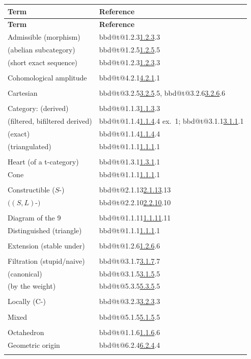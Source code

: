 \documentclass[12pt,oneside]{amsbook}
\makeatletter
\DeclareRobustCommand{\rn}[1]{%
  \ifcsname bbd@t@#1\endcsname\hyperlink{bbd:#1}{#1}\else#1\fi}
\theoremstyle{plain}
\theoremstyle{definition}
\makeatother
\begin{document}
\begin{longtable}{@{}p{}p{}@{}}
\hline
\textbf{Term} & \textbf{Reference}\\
\hline
\endfirsthead
\hline
\textbf{Term} & \textbf{Reference}\\
\hline
\endhead
Admissible (morphism) & \rn{1.2.3}\\
\quad (abelian subcategory) & \rn{1.2.5}\\
\quad (short exact sequence) & \rn{1.2.3}\\[3pt]\\
Cohomological amplitude & \rn{4.2.1}\\[3pt]\\
Cartesian & \rn{3.2.5}, \rn{3.2.6}\\[3pt]\\
Category: (derived) & \rn{1.1.3}\\
\quad (filtered, bifiltered derived) & \rn{1.1.4} ex.~1; \rn{3.1.1}\\
\quad (exact) & \rn{1.1.4}\\
\quad (triangulated) & \rn{1.1.1}\\[3pt]\\
Heart (of a t-category) & \rn{1.3.1}\\
Cone & \rn{1.1.1}\\[3pt]\\
Constructible ($S$-) & \rn{2.1.13}\\
\quad $((S,L)$-$)$ & \rn{2.2.10}\\[3pt]\\
Diagram of the 9 & \rn{1.1.11}\\
Distinguished (triangle) & \rn{1.1.1}\\[3pt]\\
Extension (stable under) & \rn{1.2.6}\\[3pt]\\
Filtration (stupid/naive) & \rn{3.1.7}\\
\quad (canonical) & \rn{3.1.5}\\
\quad (by the weight) & \rn{5.3.5}\\[3pt]\\
Locally (C-) & \rn{3.2.3}\\[3pt]\\
Mixed & \rn{5.1.5}\\[3pt]\\
Octahedron & \rn{1.1.6}\\
Geometric origin & \rn{6.2.4}\\[3pt]\\

\end{longtable}
\end{document}
